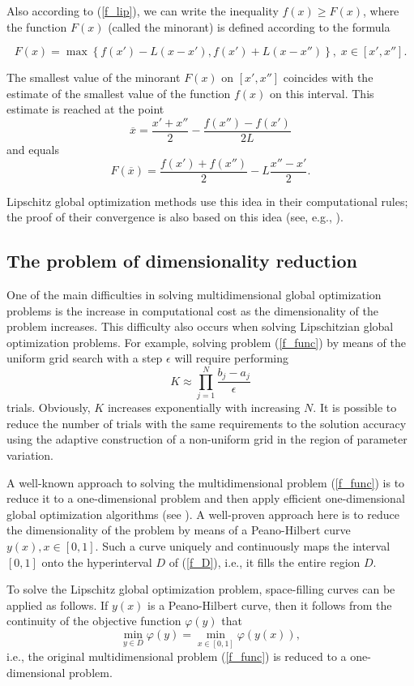 \documentclass[preprint,12pt]{elsarticle}
\begin{document}
Also according to (\ref{f_lip}), we can write the inequality $f(x) \geq F(x)$, where the function  $F(x)$ (called the minorant) is defined according to the formula

\[
F(x) = \max\left\{f(x') - L(x-x'),f(x') + L(x-x'')\right\}, \; x\in [x', x''].
\] 

The smallest value of the minorant $F(x)$ on $[x', x'']$ coincides with the estimate of the smallest value of the function $f(x)$ on this interval. This estimate is reached at the point
\[
\overline{x} = \frac{x'+x''}{2}-\frac{f(x'')-f(x')}{2L}
\] 
and equals
\[
F(\overline{x}) = \frac{f(x')+f(x'')}{2} -L \frac{x''-x'}{2}.
\]

Lipschitz global optimization methods use this idea in their computational rules; the proof of their convergence is also based on this idea (see, e.g.,
\cite{Jones2021,PaulaviciusZilinskas2014,Sergeyev2013,Evtushenko2013}).

\subsection{The problem of dimensionality reduction} 

One of the main difficulties in solving multidimensional global optimization problems is the increase in computational cost as the dimensionality of the problem increases. This difficulty also occurs when solving Lipschitzian global optimization problems. 
For example, solving problem (\ref{f_func}) by means of the uniform grid search with a step $\epsilon$ will require performing
\[
K \approx \prod_{j=1}^N{\frac{b_j-a_j}{\epsilon}}
\]
trials. Obviously, $K$ increases exponentially with increasing $N$. It is possible to reduce the number of trials with the same requirements to the solution accuracy using the adaptive construction of a non-uniform grid in the region of parameter variation. 


A well-known approach to solving the multidimensional problem (\ref{f_func}) is to reduce it to a one-dimensional problem and then apply efficient one-dimensional global optimization algorithms (see \cite{Strongin2000,Sergeyev2013}). A well-proven approach here is to reduce the dimensionality of the problem by means of a Peano-Hilbert curve $y(x), x \in [0, 1]$.  Such a curve uniquely and continuously maps the interval $[0, 1]$ onto the hyperinterval $D$ of (\ref{f_D}), i.e., it fills the entire region $D$.


To solve the Lipschitz global optimization problem, space-filling curves can be applied as follows. If $y(x)$ is a Peano-Hilbert curve, then it follows from the continuity of the objective function $\varphi(y)$ that
\[
\min_{y \in D } \varphi(y) = \min_{x \in [0,1] } \varphi(y(x)),
\]
i.e., the original multidimensional problem (\ref{f_func}) is reduced to a one-dimensional problem.
\end{document}
